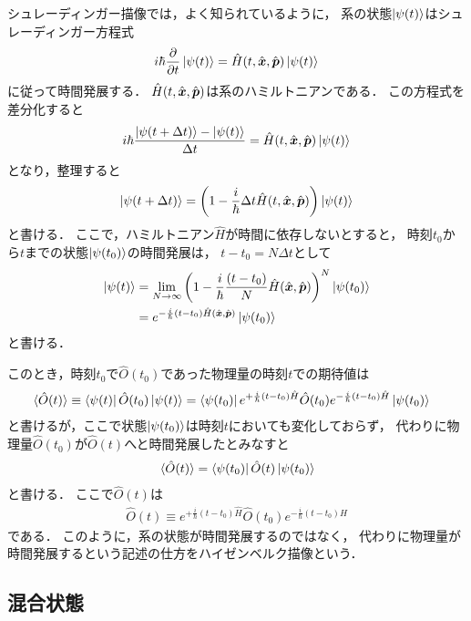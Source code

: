 \documentclass[uplatex,dvipdfmx]{vkaishi}
\begin{document}
シュレーディンガー描像では，よく知られているように，
系の状態$\ket{\psi(t)}$はシュレーディンガー方程式
\begin{align}
  i\hbar \pdv{t} \ket{\psi(t)} = \hat H(t, \hat{\vb*x}, \hat{\vb*p}) \ket{\psi(t)}
\end{align}
に従って時間発展する．
$\hat H(t, \hat{\vb*x}, \hat{\vb*p})$は系のハミルトニアンである．
この方程式を差分化すると
\begin{align*}
  i\hbar \frac{\ket{\psi(t + \Delta t)} - \ket{\psi(t)}}{\Delta t}
  = \hat H(t, \hat{\vb*x}, \hat{\vb*p}) \ket{\psi(t)}
\end{align*}
となり，整理すると
\begin{align}
  \ket{\psi(t + \Delta t)}
  = \qty(1 - \frac{i}{\hbar} \Delta t \hat H(t, \hat{\vb*x}, \hat{\vb*p})) \ket{\psi(t)}
\end{align}
と書ける．
ここで，ハミルトニアン$\hat H$が時間に依存しないとすると，
時刻$t_0$から$t$までの状態$\ket{\psi(t_0)}$の時間発展は，
$t - t_0 = N \Delta t$として
\begin{align*}
  \ket{\psi(t)}
  &= \lim_{N\to\infty} \qty(1 - \frac{i}{\hbar} \frac{(t - t_0)}{N} \hat H(\hat{\vb*x}, \hat{\vb*p}))^N \ket{\psi(t_0)} \\
  &= e^{- \frac{i}{\hbar} (t - t_0) \hat H(\hat{\vb*x}, \hat{\vb*p})} \ket{\psi(t_0)}
\end{align*}
と書ける．

このとき，時刻$t_0$で$\hat O(t_0)$であった物理量の時刻$t$での期待値は
\begin{align}
  \expval*{\hat O(t)}
    \equiv \bra{\psi(t)} \hat O(t_0) \ket{\psi(t)}
    &= \bra{\psi(t_0)} e^{+ \frac{i}{\hbar} (t - t_0) \hat H} \hat O(t_0) e^{- \frac{i}{\hbar} (t - t_0) \hat H} \ket{\psi(t_0)}
\end{align}
と書けるが，ここで状態$\ket{\psi(t_0)}$は時刻$t$においても変化しておらず，
代わりに物理量$\hat O(t_0)$が$\hat O(t)$へと時間発展したとみなすと
\begin{align}
  \expval*{\hat O(t)}
  = \bra{\psi(t_0)} \hat O(t) \ket{\psi(t_0)}
\end{align}
と書ける．
ここで$\hat O(t)$は
\begin{align}
  \hat O(t) \equiv e^{+ \frac{i}{\hbar} (t - t_0) \hat H} \hat O(t_0) e^{- \frac{i}{\hbar} (t - t_0) \hat H}
\end{align}
である．
このように，系の状態が時間発展するのではなく，
代わりに物理量が時間発展するという記述の仕方をハイゼンベルク描像という．

\subsection{混合状態}
\end{document}

